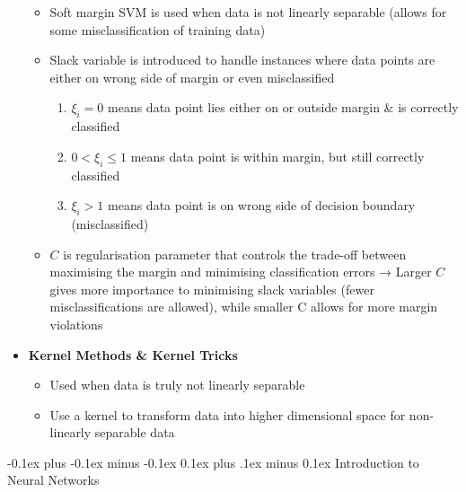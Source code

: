 \documentclass[landscape]{article}
\makeatletter
\renewcommand{\section}{\@startsection{section}{1}{0mm}%
  {-0.1ex plus -0.1ex minus -0.1ex}%
  {0.1ex plus .1ex minus 0.1ex}%
{\normalfont\small\bfseries}}
\makeatother
\begin{document}
\begin{multicols*}{5}
\begin{itemize}
          \begin{itemize}
            \item Soft margin SVM is used when data is not linearly separable (allows for some misclassification of training data)
            \item Slack variable is introduced to handle instances where data points are either on wrong side of margin or even misclassified
            \begin{enumerate}
              \item $\xi_i = 0$ means data point lies either on or outside margin \& is correctly classified
              \item $0 < \xi_i \leq 1$ means data point is within margin, but still correctly classified
              \item $\xi_i > 1$ means data point is on wrong side of decision boundary (misclassified)
            \end{enumerate}
            \item $C$ is regularisation parameter that controls the trade-off between maximising the margin and minimising classification errors → Larger $C$ gives more importance to minimising slack variables (fewer misclassifications are allowed), while smaller C allows for more margin violations
          \end{itemize}
          \item \textbf{Kernel Methods \& Kernel Tricks}
          \begin{itemize}
            \item Used when data is truly not linearly separable
            \item Use a kernel to transform data into higher dimensional space for non-linearly separable data
          \end{itemize}
        \end{itemize}

        \section{Introduction to Neural Networks}

\end{multicols*}
\end{document}
